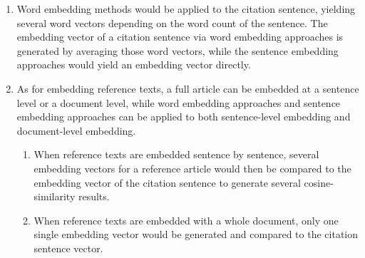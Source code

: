 \begin{enumerate}
    \item Word embedding methods would be applied to the citation sentence, yielding several word vectors depending on the word count of the sentence.
    The embedding vector of a citation sentence via word embedding approaches is generated by averaging those word vectors, while the sentence embedding approaches would yield an embedding vector directly.
    \item As for embedding reference texts, a full article can be embedded at a sentence level or a document level, while word embedding approaches and sentence embedding approaches can be applied to both sentence-level embedding and document-level embedding.
    \begin{enumerate}
        \item When reference texts are embedded sentence by sentence, several embedding vectors for a reference article would then be compared to the embedding vector of the citation sentence to generate several cosine-similarity results.
        \item When reference texts are embedded with a whole document, only one single embedding vector would be generated and compared to the citation sentence vector.
    \end{enumerate}
\end{enumerate}
